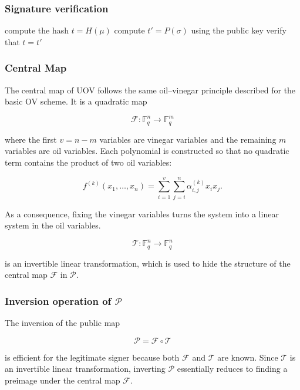 \subsubsection*{Signature verification}
\begin{algorithm}
\begin{algorithmic}[1]
    \State compute the hash $t = H(\mu)$
    \State compute $t' = P(\sigma)$ using the public key
    \State verify that $t = t'$
\end{algorithmic}
\end{algorithm}

\subsubsection{Central Map}
The central map of UOV follows the same oil--vinegar principle described for the basic OV scheme. It is a quadratic map

\[
\mathcal{F} : \mathbb{F}_q^n \rightarrow \mathbb{F}_q^m
\]

\noindent
where the first \(v=n-m\) variables are vinegar variables and the remaining \(m\) variables are oil variables. Each polynomial is constructed so that no quadratic term contains the product of two oil variables:

\[
f^{(k)}(x_1,\ldots,x_n)
=
\sum_{i=1}^{v}\sum_{j=i}^{n}
\alpha_{i,j}^{(k)} x_i x_j .
\]

\noindent
As a consequence, fixing the vinegar variables turns the system into a linear system in the oil variables.

\[
\mathcal{T} : \mathbb{F}_q^n \rightarrow \mathbb{F}_q^n
\]

\noindent
is an invertible linear transformation, which is used to hide the structure of the central map \(\mathcal{F}\) in \(\mathcal{P}\).

\subsubsection*{Inversion operation of $\mathcal{P}$}
The inversion of the public map

\[
\mathcal{P} = \mathcal{F} \circ \mathcal{T}
\]

\noindent
is efficient for the legitimate signer because both \(\mathcal{F}\) and \(\mathcal{T}\) are known. Since \(\mathcal{T}\) is an invertible linear transformation, inverting \(\mathcal{P}\) essentially reduces to finding a 
preimage under the central map \(\mathcal{F}\).
\medskip

